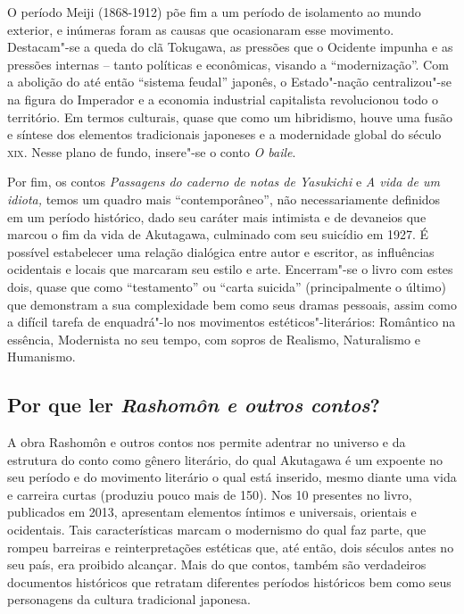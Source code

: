\documentclass[12pt]{extarticle}
\begin{document}
O período Meiji (1868-1912) põe fim a um período de isolamento ao mundo
exterior, e inúmeras foram as causas que ocasionaram esse movimento.
Destacam"-se a queda do clã Tokugawa, as pressões que o Ocidente impunha
e as pressões internas -- tanto políticas e econômicas, visando a
``modernização''. Com a abolição do até então ``sistema feudal''
japonês, o Estado"-nação centralizou"-se na figura do Imperador e a
economia industrial capitalista revolucionou todo o território. Em
termos culturais, quase que como um hibridismo, houve uma fusão e
síntese dos elementos tradicionais japoneses e a modernidade global do
século \textsc{xix}. Nesse plano de fundo, insere"-se o conto \emph{O baile}.


Por fim, os contos \emph{Passagens do caderno de notas de Yasukichi} e
\emph{A vida de um idiota,} temos um quadro mais ``contemporâneo'', não
necessariamente definidos em um período histórico, dado seu caráter mais
intimista e de devaneios que marcou o fim da vida de Akutagawa,
culminado com seu suicídio em 1927. É possível estabelecer uma relação
dialógica entre autor e escritor, as influências ocidentais e locais que
marcaram seu estilo e arte. Encerram"-se o livro com estes dois, quase
que como ``testamento'' ou ``carta suicida'' (principalmente o último)
que demonstram a sua complexidade bem como seus dramas pessoais, assim
como a difícil tarefa de enquadrá"-lo nos movimentos
estéticos"-literários: Romântico na essência, Modernista no seu tempo,
com sopros de Realismo, Naturalismo e Humanismo.


\subsection{Por que ler \textit{Rashomôn e outros contos}?}

A obra Rashomôn e outros contos nos permite adentrar no universo e da
estrutura do conto como gênero literário, do qual Akutagawa é um
expoente no seu período e do movimento literário o qual está inserido,
mesmo diante uma vida e carreira curtas (produziu pouco mais de 150).
Nos 10 presentes no livro, publicados em 2013, apresentam elementos
íntimos e universais, orientais e ocidentais. Tais características
marcam o modernismo do qual faz parte, que rompeu barreiras e
reinterpretações estéticas que, até então, dois séculos antes no seu
país, era proibido alcançar. Mais do que contos, também são verdadeiros
documentos históricos que retratam diferentes períodos históricos bem
como seus personagens da cultura tradicional japonesa.
\end{document}
